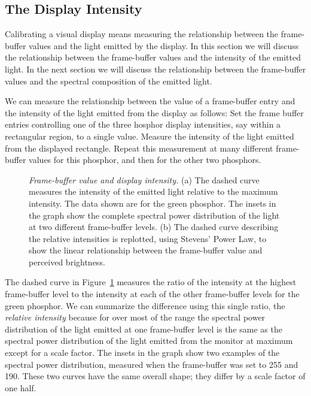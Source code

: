 \subsection*{The Display Intensity}
Calibrating a visual display means measuring the relationship between
the frame-buffer values and the light emitted by the display.  In this
section we will discuss the relationship between the frame-buffer
values and the intensity of the emitted light.  In the next section we
will discuss the relationship between the frame-buffer values and the
spectral composition of the emitted light.

We can measure the relationship between the value of a frame-buffer
entry and the intensity of the light emitted from the display as
follows: Set the frame buffer entries controlling one of the three
hosphor display intensities, say within a rectangular region, to a
single value.  Measure the intensity of the light emitted from the
displayed rectangle.  Repeat this measurement at many different
frame-buffer values for this phosphor, and then for the other two
phosphors.

\begin{figure}
\centerline{
}
\caption[Frame-buffer control of Phosphor Intensity.]{
{\em Frame-buffer value and display intensity.}  (a) The dashed curve
measures the intensity of the emitted light relative to the maximum
intensity.  The data shown are for the green phosphor.  The insets in
the graph show the complete spectral power distribution of the light
at two different frame-buffer levels.  (b) The dashed curve describing
the relative intensities is replotted, using Stevens' Power Law, to
show the linear relationship between the frame-buffer value and
perceived brightness.  }
\label{fa2:displayGamma}
\end{figure}

The dashed curve in Figure~\ref{fa2:displayGamma} measures the ratio
of the intensity at the highest frame-buffer level to the intensity at
each of the other frame-buffer levels for the green phosphor.  We can
summarize the difference using this single ratio, the {\em relative
intensity} because for over most of the range the spectral power
distribution of the light emitted at one frame-buffer level is the
same as the spectral power distribution of the light emitted from the
monitor at maximum except for a scale factor.  The insets in the graph
show two examples of the spectral power distribution, measured when
the frame-buffer was set to 255 and 190.  These two curves have the
same overall shape; they differ by a scale factor of one half.

